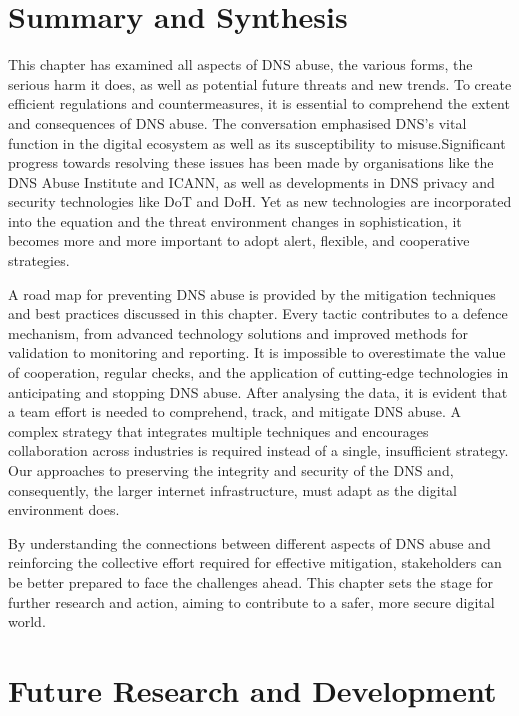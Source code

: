 \section{Summary and Synthesis}

This chapter has examined all aspects of DNS abuse,  the various forms, the serious harm it does, as well as potential future threats and new trends. To create efficient regulations and countermeasures, it is essential to comprehend the extent and consequences of DNS abuse. The conversation emphasised DNS's vital function in the digital ecosystem as well as its susceptibility to misuse.Significant progress towards resolving these issues has been made by organisations like the DNS Abuse Institute and ICANN, as well as developments in DNS privacy and security technologies like DoT and DoH. Yet as new technologies are incorporated into the equation and the threat environment changes in sophistication, it becomes more and more important to adopt alert, flexible, and cooperative strategies.  

A road map for preventing DNS abuse is provided by the mitigation techniques and best practices discussed in this chapter. Every tactic contributes to a defence mechanism, from advanced technology solutions and improved methods for validation to monitoring and reporting. It is impossible to overestimate the value of cooperation, regular checks, and the application of cutting-edge technologies in anticipating and stopping DNS abuse. After analysing the data, it is evident that a team effort is needed to comprehend, track, and mitigate DNS abuse. A complex strategy that integrates multiple techniques and encourages collaboration across industries is required instead of a single, insufficient strategy. Our approaches to preserving the integrity and security of the DNS and, consequently, the larger internet infrastructure, must adapt as the digital environment does.

By understanding the connections between different aspects of DNS abuse and reinforcing the collective effort required for effective mitigation, stakeholders can be better prepared to face the challenges ahead. This chapter sets the stage for further research and action, aiming to contribute to a safer, more secure digital world.

\section{Future Research and Development}

